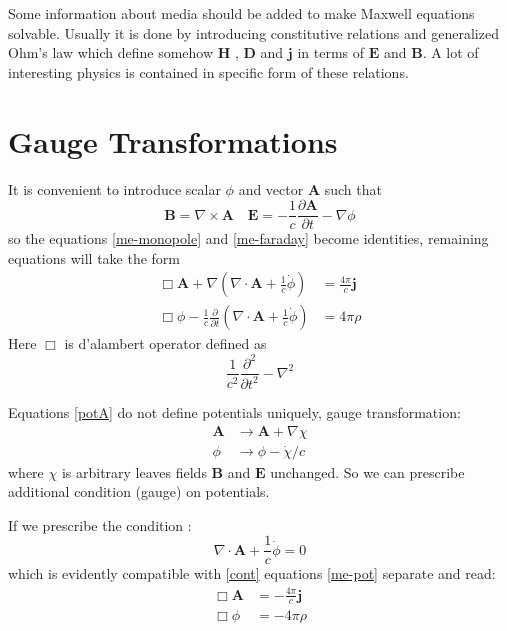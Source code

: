 Some information about media should be added to make Maxwell
equations solvable. Usually it is done by introducing constitutive
relations and generalized Ohm's law which define somehow 
$ \bm H $ , $ \bm D $ and $ \bm j $ in terms of 
$ \bm E $ and $ \bm B $. A lot of interesting physics
is contained in specific form of these relations.

\section{Gauge Transformations}
\label{sec:ed-gauge-transformations}

It is convenient to introduce scalar $\phi$ and vector $\bm A$ such that
\begin{equation}
   \label {potA}
   \bm B = \nabla \times \bm A \quad \bm E = -\frac{1}{c} \frac{\partial \bm A}{\partial t} - \nabla \phi
\end{equation}
so the equations \eqref{me-monopole} and \eqref{me-faraday} become identities, remaining equations will
take the form
\begin{equation}
   \label {me-pot}
   \begin{split}
       \Box \bm A + \nabla ( \nabla \cdot \bm A+ \frac{1}{c} \dot \phi) &= \frac{4 \pi}{c} \bm j \\
       \Box \phi -\frac{1}{c} \frac{\partial}{\partial t}( \nabla \cdot \bm A+ \frac{1}{c} \dot \phi) & = 4 \pi \rho
   \end{split}
\end{equation}
Here $ \Box $ is d'alambert operator defined as \[  \frac{1}{c^2} \frac{\partial^2}{\partial t^2}-\nabla^2 \]

Equations \eqref{potA} do not define potentials uniquely, gauge transformation: 
\begin{equation}
   \label {gauge-transformation}
   \begin{split}
       \bm A &\rightarrow \bm A+ \nabla \chi \\
       \phi & \rightarrow \phi - \dot \chi /c
   \end{split}
\end{equation}
 where $ \chi  $ is arbitrary leaves fields $ \bm B $
and $ \bm E $ unchanged. So we can prescribe additional
condition (gauge) on potentials.

If we prescribe the condition :
\begin{equation}
   \label {lg}
    \nabla \cdot \bm A+ \frac{1}{c} \dot \phi=0
\end{equation}
which is evidently compatible with \eqref{cont} equations \eqref{me-pot} separate and read:
\begin{equation}
   \label {me-pot-lg}
   \begin{split}
       \Box \bm A &= -\frac{4 \pi}{c} \bm j \\
       \Box \phi  & = -4 \pi \rho
   \end{split}
\end{equation}


